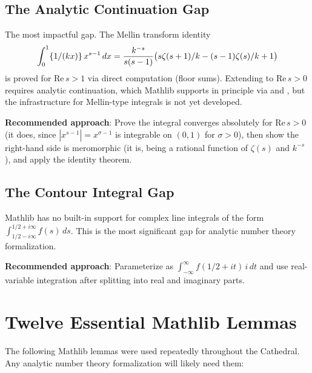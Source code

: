 \documentclass[11pt,a4paper]{article}
\begin{document}
\subsection{The Analytic Continuation Gap}

The most impactful gap. The Mellin transform identity
\[
  \int_0^1 \{1/(kx)\}\,x^{s-1}\,dx = \frac{k^{-s}}{s(s-1)}
  \bigl(s\zeta(s+1)/k - (s-1)\zeta(s)/k + 1\bigr)
\]
is proved for $\mathrm{Re}\,s > 1$ via direct computation (floor
sums). Extending to $\mathrm{Re}\,s > 0$ requires analytic
continuation, which Mathlib supports in principle via
 and , but the
infrastructure for Mellin-type integrals is not yet developed.

\textbf{Recommended approach}: Prove the integral converges
absolutely for $\mathrm{Re}\,s > 0$ (it does, since
$|x^{s-1}| = x^{\sigma-1}$ is integrable on $(0,1)$ for
$\sigma > 0$), then show the right-hand side is meromorphic (it
is, being a rational function of $\zeta(s)$ and $k^{-s}$), and
apply the identity theorem.

\subsection{The Contour Integral Gap}

Mathlib has no built-in support for complex line integrals of the form
$\int_{1/2-i\infty}^{1/2+i\infty} f(s)\,ds$. This is the most significant
gap for analytic number theory formalization.

\textbf{Recommended approach}: Parameterize as
$\int_{-\infty}^{\infty} f(1/2 + it)\,i\,dt$ and use real-variable
integration after splitting into real and imaginary parts.

\section{Twelve Essential Mathlib Lemmas}
\label{sec:lemmas}

The following Mathlib lemmas were used repeatedly throughout the
Cathedral. Any analytic number theory formalization will likely
need them:
\end{document}
